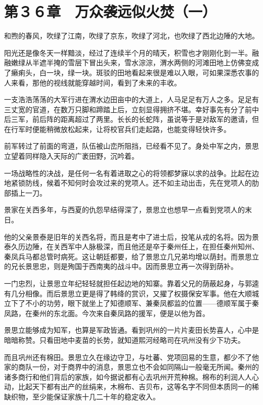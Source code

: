 \section{第３６章　万众袭远似火焚（一）}

和煦的春风，吹绿了江南，吹绿了京东，吹绿了河北，也吹绿了西北边陲的大地。

阳光还是像冬天一样黯淡，经过了连续半个月的晴天，积雪也才刚刚化到一半。融融嫩绿从半遮半掩的雪层下冒出头来，雪水淙淙，渭水两侧的河滩田地上仿佛变成了癞痢头，白一块，绿一块。斑驳的田地看起来很是难以入眼，可如果深悉农事的人来看，那他的视线就能穿越时间，看到了未来的丰收。

一支浩浩荡荡的大军行进在渭水边田亩中的大道上，人马足足有万人之多。足足有三丈宽的官道，在数万只脚和蹄踏上后，立刻显得拥挤不堪。幸好事先有分了前中后三军，前后阵的距离超过了两里。长长的长蛇阵，虽说等于是对敌军的邀请，但在行军时便能稍微放松起来，让将校官兵们走起路，也能变得轻快许多。

前军转过了前面的弯道，队伍被山峦所阻挡，已经看不见了。身处中军之内，景思立望着同样隐入天际的广袤田野，沉吟着。

一场战略性的决战，是任何一名有着进取之心的将领都梦寐以求的战争。比起在边地紧锁防线，候着不知何时会攻过来的党项人。还不如主动出击，先在党项人的肋部插上一刀。

景家在关西多年，与西夏的仇怨早结得深了，景思立也想早一点看到党项人的末日。

他的父亲景泰是旧年的关西名将，而且是考中了进士后，投笔从戎的名将。因为景泰久历边陲，在关西军中人脉极深，而且他还是卒于秦州任上，在担任秦州知州、秦凤兵马都总管时病死。这让朝廷都要，给了景思立几兄弟均增以荫封。而景思立的兄长景思忠，则是殉国于西南夷的战斗中。因而景思立再一次得到荫补。

一门忠烈，让景思立年纪轻轻就担任起边地的知寨。靠着父兄的荫蔽起身，与郭逵有几分相像。而后景思立更是得了韩绛的赏识，又擢了权摄保安军事。他在大顺城立下了不小的功劳，眼下就坐上了知德顺军、兼秦凤都监的位置——德顺军属于秦凤路，在秦州的东北面。今次来自秦凤路的援军，便是以他为首。

景思立能够成为知军，也算是军政皆通。看到巩州的一片片麦田长势喜人，心中是暗暗称赞。只看田地中麦苗的长势，就知道熙河经略司在巩州没有少下功夫。

而且巩州还有棉田。景思立久在缘边守卫，与吐蕃、党项回易的生意，都少不了他家的商队一份，对于商界中的消息，景思立也不会如同隔山一般毫无所闻。秦州的诸多商行和他们背后的家族，如今据说都有心去巩州开荒种棉。棉布的利润人人心动，比起天下都有出产的丝绢来，木棉布、吉贝布，这等名字不同但本质同一的稀缺织物，至少能保证家族十几二十年的稳定收入。

